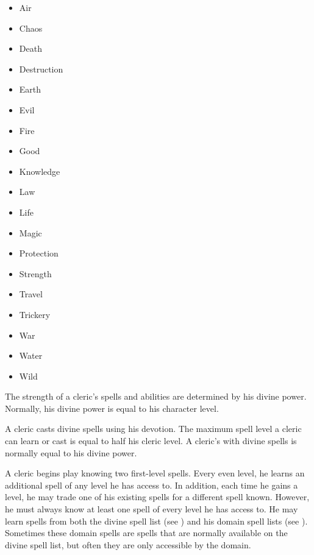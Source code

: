         \begin{itemize}
            \item{Air}
            \item{Chaos}
            \item{Death}
            \item{Destruction}
            \item{Earth}
            \item{Evil}
            \item{Fire}
            \item{Good}
            \item{Knowledge}
            \item{Law}
            \item{Life}
            \item{Magic}
            \item{Protection}
            \item{Strength}
            \item{Travel}
            \item{Trickery}
            \item{War}
            \item{Water}
            \item{Wild}
        \end{itemize}

        The strength of a cleric's spells and abilities are determined by his divine power.
        Normally, his divine power is equal to his character level.

        A cleric casts divine spells using his devotion.
        The maximum spell level a cleric can learn or cast is equal to half his cleric level.
        A cleric's  with divine spells is normally equal to his divine power.

        A cleric begins play knowing two first-level spells.
        Every even level, he learns an additional spell of any level he has access to.
        In addition, each time he gains a level, he may trade one of his existing spells for a different spell known.
        However, he must always know at least one spell of every level he has access to.
        He may learn spells from both the divine spell list (see ) and his domain spell lists (see ).
        Sometimes these domain spells are spells that are normally available on the divine spell list, but often they are only accessible by the domain.

